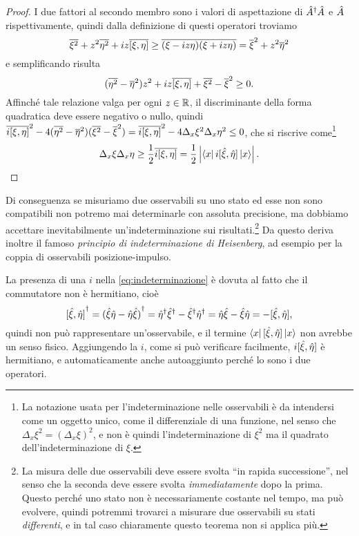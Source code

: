 \begin{proof}
	I due fattori al secondo membro sono i valori di aspettazione di ${\hat{A}}^\dagger\hat{A}$	e $\hat{A}$ rispettivamente, quindi dalla definizione di questi operatori troviamo
	\begin{equation}
		\overline{\xi^2}+z^2\overline{\eta^2}+iz\overline{[\xi,\eta]}\geq\overline{(\xi-iz\eta)}\overline{(\xi+iz\eta)}=\overline{\xi}^2+z^2\overline{\eta}^2
	\end{equation}
	e semplificando risulta
	\begin{equation}
		(\overline{\eta^2}-\overline{\eta}^2)z^2+iz\overline{[\xi,\eta]}+\overline{\xi^2}-\overline{\xi}^2\geq 0.
	\end{equation}
	Affinch\'e tale relazione valga per ogni $z\in\mathbb{R}$, il discriminante della forma quadratica deve essere negativo o nullo, quindi $\overline{i[\xi,\eta]}^2-4(\overline{\eta^2}-\overline{\eta}^2)(\overline{\xi^2}-\overline{\xi}^2)=\overline{i[\xi,\eta]}^2-4\Delta_x\xi^2\Delta_x\eta^2\leq 0$, che si riscrive come\footnote{La notazione usata per l'indeterminazione nelle osservabili è da intendersi come un oggetto unico, come il differenziale di una funzione, nel senso che $\Delta_x\xi^2=(\Delta_x\xi)^2$, e non è quindi l'indeterminazione di $\xi^2$ ma il quadrato dell'indeterminazione di $\xi$.}
	\begin{equation}
		\Delta_x\xi\Delta_x\eta\geq\frac12\overline{i[\xi,\eta]}=\frac12\left|{\left\langle{x}\right|i[\hat{\xi},\hat{\eta}]\left|{x}\right\rangle}\right|.
	\end{equation}
\end{proof}
Di conseguenza se misuriamo due osservabili su uno stato ed esse non sono compatibili non potremo mai determinarle con assoluta precisione, ma dobbiamo accettare inevitabilmente un'indeterminazione sui risultati.\footnote{La misura delle due osservabili deve essere svolta ``in rapida successione'', nel senso che la seconda deve essere svolta \emph{immediatamente} dopo la prima. Questo perch\'e uno stato non è necessariamente costante nel tempo, ma può evolvere, quindi potremmi trovarci a misurare due osservabili su stati \emph{differenti}, e in tal caso chiaramente questo teorema non si applica più.}
Da questo deriva inoltre il famoso \emph{principio di indeterminazione di Heisenberg}, ad esempio per la coppia di osservabili posizione-impulso.

La presenza di una $i$ nella \eqref{eq:indeterminazione} è dovuta al fatto che il commutatore non è hermitiano, cioè
\begin{equation}
	{[\hat{\xi},\hat{\eta}]}^\dagger={(\hat{\xi}\hat{\eta}-\hat{\eta}\hat{\xi})}^\dagger={\hat{\eta}}^\dagger{\hat{\xi}}^\dagger-{\hat{\xi}}^\dagger{\hat{\eta}}^\dagger=\hat{\eta}\hat{\xi}-\hat{\xi}\hat{\eta}=-[\hat{\xi},\hat{\eta}],
	\label{eq:commutatore-antihermitiano}
\end{equation}
quindi non può rappresentare un'osservabile, e il termine $\left\langle{x}\right|[\hat{\xi},\hat{\eta}]\left|{x}\right\rangle$ non avrebbe un senso fisico.
Aggiungendo la $i$, come si può verificare facilmente, $i[\hat{\xi},\hat{\eta}]$ è hermitiano, e automaticamente anche autoaggiunto perch\'e lo sono i due operatori.

